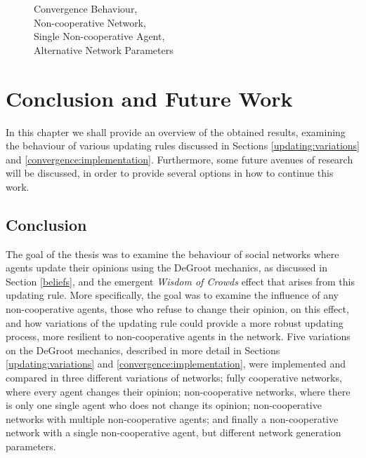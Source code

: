 \documentclass[a4paper, 12pt]{report}
\begin{document}
\begin{figure}[!htbp]
\begin{minipage}{.45\linewidth}
    \end{minipage}\par\medskip
    \centering
    
    \caption{Convergence Behaviour, \\ Non-cooperative Network, \\ Single Non-cooperative Agent, \\ Alternative Network Parameters}
\end{figure}

\newpage

\chapter{Conclusion and Future Work}
\label{chapter:conclusion}
In this chapter we shall provide an overview of the obtained results, examining the behaviour of various updating rules discussed in Sections \ref{updating:variations} and \ref{convergence:implementation}. Furthermore, some future avenues of research will be discussed, in order to provide several options in how to continue this work.

\section{Conclusion}

The goal of the thesis was to examine the behaviour of social networks where agents update their opinions using the DeGroot mechanics, as discussed in Section \ref{beliefs}, and the emergent \emph{Wisdom of Crowds} effect that arises from this updating rule. More specifically, the goal was to examine the influence of any non-cooperative agents, those who refuse to change their opinion, on this effect, and how variations of the updating rule could provide a more robust updating process, more resilient to non-cooperative agents in the network. Five variations on the DeGroot mechanics, described in more detail in Sections \ref{updating:variations} and \ref{convergence:implementation}, were implemented and compared in three different variations of networks; fully cooperative networks, where every agent changes their opinion; non-cooperative networks, where there is only one single agent who does not change its opinion; non-cooperative networks with multiple non-cooperative agents; and finally a non-cooperative network with a single non-cooperative agent, but different network generation parameters.
\end{document}
